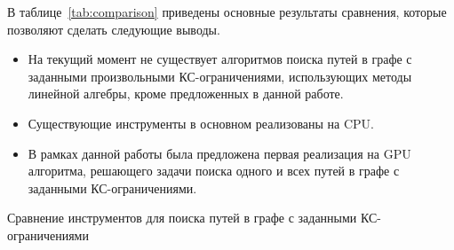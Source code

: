 В таблице~\ref{tab:comparison} приведены основные результаты сравнения, которые позволяют сделать следующие выводы.

\begin{itemize}
    \item На текущий момент не существует алгоритмов поиска путей в графе с заданными произвольными КС-ограничениями, использующих методы линейной алгебры, кроме предложенных в данной работе.
    \item Существующие инструменты в основном реализованы на CPU.
    \item В рамках данной работы была предложена первая реализация на GPU алгоритма, решающего задачи поиска одного и всех путей в графе с заданными КС-ограничениями.
\end{itemize}

\begin{table} [h]
  \centering

\begin{threeparttable}
\caption{Сравнение инструментов для поиска путей в графе с заданными КС-ограничениями}\label{tab:comparison}
  

\end{threeparttable}
\end{table}
